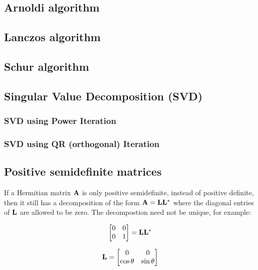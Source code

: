 \subsection{Arnoldi algorithm}
\subsection{Lanczos algorithm}
\subsection{Schur algorithm}

\subsection{Singular Value Decomposition (SVD)}
\subsubsection{SVD using Power Iteration}
\subsubsection{SVD using QR (orthogonal) Iteration}


\subsection{Positive semidefinite matrices}

If a Hermitian matrix $ \mathbf{A} $ is only positive semidefinite, instead of positive
definite, then it still has a decomposition of the form $ \mathbf{A} = \mathbf{L} \mathbf{L}^* $
where the diagonal entries of $ \mathbf{L} $ are allowed to be zero. The decompostion
need not be unique, for example:

\begin{equation}
    \begin{bmatrix}
        0 & 0 \\
        0 & 1\\
    \end{bmatrix}
    = \mathbf{L} \mathbf{L}^*
\end{equation}

\begin{equation}
    \mathbf{L} =
    \begin{bmatrix}
        0 & 0 \\
        \cos \theta & \sin \theta
    \end{bmatrix}
\end{equation}

